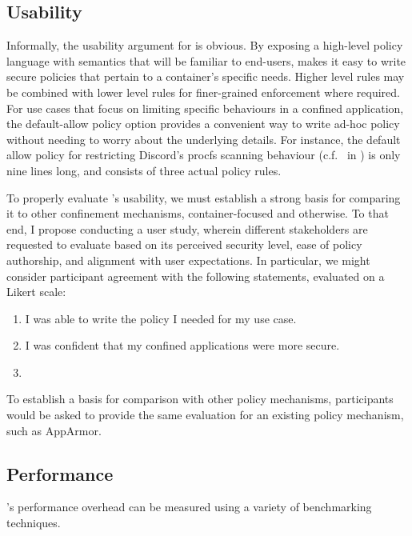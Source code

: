 \subsection{Usability}

Informally, the usability argument for \bpfcontain{} is obvious. By exposing a high-level policy language with semantics that will be familiar to end-users, \bpfcontain{} makes it easy to write secure policies that pertain to a container's specific needs. Higher level rules may be combined with lower level rules for finer-grained enforcement where required. For use cases that focus on limiting specific behaviours in a confined application, the default-allow policy option provides a convenient way to write ad-hoc policy without needing to worry about the underlying details. For instance, the default allow policy for restricting Discord's procfs scanning behaviour (c.f.~ in ) is only nine lines long, and consists of three actual policy rules.

To properly evaluate \bpfcontain{}'s usability, we must establish a strong basis for comparing it to other confinement mechanisms, container-focused and otherwise. To that end, I propose conducting a user study, wherein different stakeholders are requested to evaluate \bpfcontain{} based on its perceived security level, ease of policy authorship, and alignment with user expectations.  In particular, we might consider participant agreement with the following statements, evaluated on a Likert scale:
\begin{enumerate}[label=\bf Q\arabic*.]
  \item I was able to write the policy I needed for my use case.
  \item I was confident that my confined applications were more secure.
  \item {}
\end{enumerate}
To establish a basis for comparison with other policy mechanisms, participants would be asked to provide the same evaluation for an existing policy mechanism, such as AppArmor.

\subsection{Performance}

\bpfcontain{}'s performance overhead can be measured using a variety of benchmarking techniques. 

